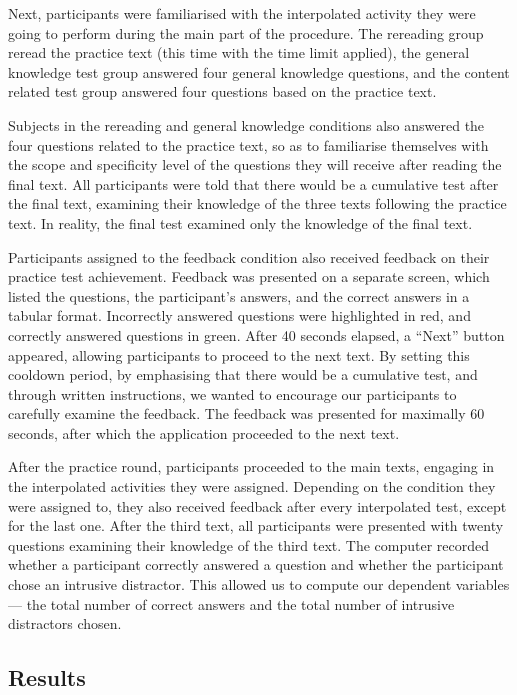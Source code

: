 \documentclass[11pt,]{article}
\begin{document}
Next, participants were familiarised with the interpolated activity they
were going to perform during the main part of the procedure. The
rereading group reread the practice text (this time with the time limit
applied), the general knowledge test group answered four general
knowledge questions, and the content related test group answered four
questions based on the practice text.

Subjects in the rereading and general knowledge conditions also answered
the four questions related to the practice text, so as to familiarise
themselves with the scope and specificity level of the questions they
will receive after reading the final text. All participants were told
that there would be a cumulative test after the final text, examining
their knowledge of the three texts following the practice text. In
reality, the final test examined only the knowledge of the final text.

Participants assigned to the feedback condition also received feedback
on their practice test achievement. Feedback was presented on a separate
screen, which listed the questions, the participant's answers, and the
correct answers in a tabular format. Incorrectly answered questions were
highlighted in red, and correctly answered questions in green. After 40
seconds elapsed, a ``Next'' button appeared, allowing participants to
proceed to the next text. By setting this cooldown period, by
emphasising that there would be a cumulative test, and through written
instructions, we wanted to encourage our participants to carefully
examine the feedback. The feedback was presented for maximally 60
seconds, after which the application proceeded to the next text.

After the practice round, participants proceeded to the main texts,
engaging in the interpolated activities they were assigned. Depending on
the condition they were assigned to, they also received feedback after
every interpolated test, except for the last one. After the third text,
all participants were presented with twenty questions examining their
knowledge of the third text. The computer recorded whether a participant
correctly answered a question and whether the participant chose an
intrusive distractor. This allowed us to compute our dependent variables
--- the total number of correct answers and the total number of
intrusive distractors chosen.

\hypertarget{results}{%
\subsection{Results}\label{results}}
\end{document}
